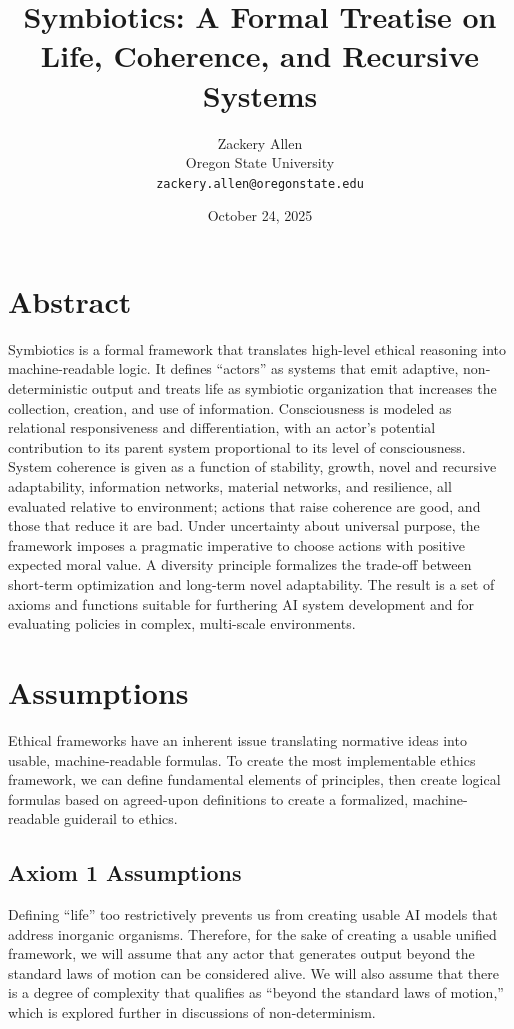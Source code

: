 \documentclass[11pt]{article}
\title{\textbf{Symbiotics: A Formal Treatise on Life, Coherence, and Recursive Systems}}
\author{Zackery Allen \\ Oregon State University \\ \texttt{zackery.allen@oregonstate.edu}}
\date{October 24, 2025}
\begin{document}
\maketitle

\section*{Abstract}
Symbiotics is a formal framework that translates high-level ethical reasoning into machine-readable logic. It defines “actors” as systems that emit adaptive, non-deterministic output and treats life as symbiotic organization that increases the collection, creation, and use of information. Consciousness is modeled as relational responsiveness and differentiation, with an actor’s potential contribution to its parent system proportional to its level of consciousness. System coherence is given as a function of stability, growth, novel and recursive adaptability, information networks, material networks, and resilience, all evaluated relative to environment; actions that raise coherence are good, and those that reduce it are bad. Under uncertainty about universal purpose, the framework imposes a pragmatic imperative to choose actions with positive expected moral value. A diversity principle formalizes the trade-off between short-term optimization and long-term novel adaptability. The result is a set of axioms and functions suitable for furthering AI system development and for evaluating policies in complex, multi-scale environments.

\section*{Assumptions}
Ethical frameworks have an inherent issue translating normative ideas into usable, machine-readable formulas. To create the most implementable ethics framework, we can define fundamental elements of principles, then create logical formulas based on agreed-upon definitions to create a formalized, machine-readable guiderail to ethics.

\subsection*{Axiom 1 Assumptions}
Defining “life” too restrictively prevents us from creating usable AI models that address inorganic organisms. Therefore, for the sake of creating a usable unified framework, we will assume that any actor that generates output beyond the standard laws of motion can be considered alive. 
We will also assume that there is a degree of complexity that qualifies as “beyond the standard laws of motion,” which is explored further in discussions of non-determinism.
\end{document}
